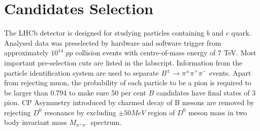 \documentclass[12pt, twoside, notitlepage, twocolumn]{article}
\begin{document}
        \section{Candidates Selection}
        The LHCb\cite{1748-0221-3-08-S08005} detector is designed for studying particles containing $b$ and $c$ quark.
        Analysed data was preselected by hardware and software trigger from approximately $10^{14}$ $pp$ collision
        events with centre-of-mass energy of 7 TeV. Most important pre-selection cuts are listed in the labscript\cite{Labsc}.
        Information from the particle identification system\cite{1211.6759} are used to separate
        $B^{\pm}\rightarrow\pi^{\pm}\pi^{+}\pi^{-}$ events. Apart from rejecting muon, the probability of each 
        particle to be a pion is required to be larger than 0.794 to make sure 50 per cent $B$ candidates have final states of 3 pion.
        CP Asymmetry introduced by charmed decay of B mesons are removed by rejecting $D^0$ 
        resonance by excluding $\pm 50MeV$ region of $D^0$ meson mass in two body invariant mass $M_{\pi^+\pi^-}$ spectrum. 
\end{document}
